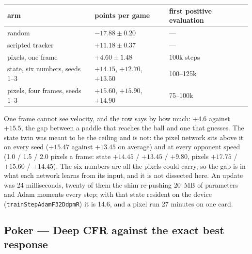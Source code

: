 \begin{center}
\begin{tabular}{@{}l l l@{}}
\hline
arm & points per game & first positive evaluation \\
\hline
random                           & $-17.88 \pm 0.20$ & --- \\
scripted tracker                 & $+11.18 \pm 0.37$ & --- \\
pixels, one frame                & $+4.60 \pm 1.48$ & 100k steps \\
state, six numbers, seeds 1--3   & $+14.15$, $+12.70$, $+13.50$ & 100--125k \\
pixels, four frames, seeds 1--3  & $+15.60$, $+15.90$, $+14.90$ & 75--100k \\
\hline
\end{tabular}
\end{center}

\noindent One frame cannot see velocity, and the row says by how much: $+4.6$ against
$+15.5$, the gap between a paddle that reaches the ball and one that guesses. The
state twin was meant to be the ceiling and is not: the pixel network sits above it on
every seed ($+15.47$ against $+13.45$ on average) and at every opponent speed (1.0 /
1.5 / 2.0 pixels a frame: state $+14.45$ / $+13.45$ / $+9.80$, pixels $+17.75$ /
$+15.60$ / $+14.45$). The six numbers are all the pixels could carry, so the gap is
in what each network learns from its input, and it is not dissected here. An update
was 24 milliseconds, twenty of them the shim re-pushing 20~MB of parameters and Adam
moments every step; with that state resident on the device
(\texttt{trainStepAdamF32DdpmR}) it is 14.6, and a pixel run 27 minutes on one card.

\subsection{Poker --- Deep CFR against the exact best response}
\label{sec:game_leduc}

